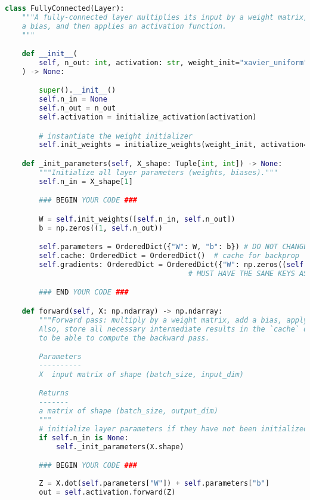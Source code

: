 \begin{lstlisting}[language=Python]
class FullyConnected(Layer):
    """A fully-connected layer multiplies its input by a weight matrix, adds
    a bias, and then applies an activation function.
    """

    def __init__(
        self, n_out: int, activation: str, weight_init="xavier_uniform"
    ) -> None:

        super().__init__()
        self.n_in = None
        self.n_out = n_out
        self.activation = initialize_activation(activation)

        # instantiate the weight initializer
        self.init_weights = initialize_weights(weight_init, activation=activation)

    def _init_parameters(self, X_shape: Tuple[int, int]) -> None:
        """Initialize all layer parameters (weights, biases)."""
        self.n_in = X_shape[1]

        ### BEGIN YOUR CODE ###

        W = self.init_weights([self.n_in, self.n_out])
        b = np.zeros((1, self.n_out))

        self.parameters = OrderedDict({"W": W, "b": b}) # DO NOT CHANGE THE KEYS
        self.cache: OrderedDict = OrderedDict()  # cache for backprop
        self.gradients: OrderedDict = OrderedDict({"W": np.zeros((self.n_in, self.n_out)), "b": np.zeros((1, self.n_out))})  # parameter gradients initialized to zero
                                           # MUST HAVE THE SAME KEYS AS `self.parameters`

        ### END YOUR CODE ###

    def forward(self, X: np.ndarray) -> np.ndarray:
        """Forward pass: multiply by a weight matrix, add a bias, apply activation.
        Also, store all necessary intermediate results in the `cache` dictionary
        to be able to compute the backward pass.

        Parameters
        ----------
        X  input matrix of shape (batch_size, input_dim)

        Returns
        -------
        a matrix of shape (batch_size, output_dim)
        """
        # initialize layer parameters if they have not been initialized
        if self.n_in is None:
            self._init_parameters(X.shape)

        ### BEGIN YOUR CODE ###
        
        Z = X.dot(self.parameters["W"]) + self.parameters["b"]
        out = self.activation.forward(Z)
        

\end{lstlisting}
